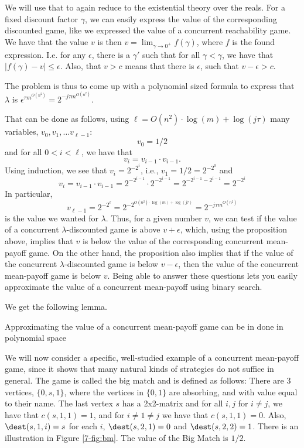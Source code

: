 We will use that to again reduce to the existential theory over the reals. 
For a fixed discount factor $\gamma$, we can easily express the value of the corresponding discounted game, like we expressed the value of a concurrent reachability game.
We have that the value $v$ is then $v=\lim_{\gamma\rightarrow 0^+} f(\gamma)$, where $f$ is the found expression.
I.e. for any $\epsilon$, there is a $\gamma'$ such that for all $\gamma<\gamma$, we have that $|f(\gamma)-v|\leq \epsilon$.
Also, that $v>c$ means that there is $\epsilon$, such that $v-\epsilon>c$.

The problem is thus to come up with a polynomial sized formula to express that $\lambda$ is $\epsilon^{\tau m^{O(n^2)}}=2^{-j \tau m^{O(n^2)}}$.

That can be done as follows, using $\ell=O(n^2)\cdot \log(m)+\log(j\tau)$ many variables, $v_0,v_1,\dots v_{\ell-1}$:
\[
v_0=1/2
\]
and for all $0<i< \ell$, we have that
\[
v_i=v_{i-1}\cdot v_{i-1}.
\]
Using induction, we see that $v_i=2^{-2^{i}}$, i.e., $v_1=1/2=2^{-2^0}$ and \[
v_i=v_{i-1}\cdot v_{i-1}=2^{-2^{i-1}}\cdot 2^{-2^{i-1}}=2^{-2^{i-1}-2^{i-1}}=2^{-2^{i}}\]
In particular, \[
v_{\ell-1}=2^{-2^{\ell}}=2^{-2^{O(n^2)\cdot \log(m)+\log(j\tau)}}=2^{-j\tau m^{O(n^2)}}
\] is the value we wanted for $\lambda$.
Thus, for a given number $v$, we can test if the value of a concurrent  $\lambda$-discounted game is above $v+\epsilon$, which, using the proposition above, implies that $v$ is below the value of the corresponding concurrent mean-payoff game. On the other hand, the proposition also implies that if the value of the concurrent  $\lambda$-discounted game is below $v-\epsilon$, then the value of the concurrent mean-payoff game is below $v$. Being able to answer these questions lets you easily approximate the value of a concurrent mean-payoff using binary search. 

We get the following lemma.
\begin{lemma}
Approximating the value of a concurrent mean-payoff game can be in done in polynomial space
\end{lemma}



We will now consider a specific, well-studied example of a concurrent mean-payoff game, since it shows that many natural kinds of strategies do not suffice in general.
The game is called the big match and is defined as follows:
There are 3 vertices, $\{0,s,1\}$, where the vertices in $\{0,1\}$ are absorbing, and with value equal to their name.
The last vertex $s$ has a 2x2-matrix and for all $i,j$ for $i\neq j$, we have that 
$c(s,1,1)=1$, and for $i\neq 1\neq j$ we have that $c(s,1,1)=0$.
Also,  $\dest(s,1,i)=s$ for each $i$, $\dest(s,2,1)=0$ and $\dest(s,2,2)=1$. There is an illustration in Figure \cref{7-fig:bm}.
The value of the Big Match is $1/2$.

